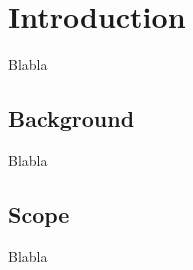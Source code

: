 \newcommand{\package}{\emph}

\chapter{Introduction}
Blabla

\section{Background}
Blabla

\section{Scope}
Blabla